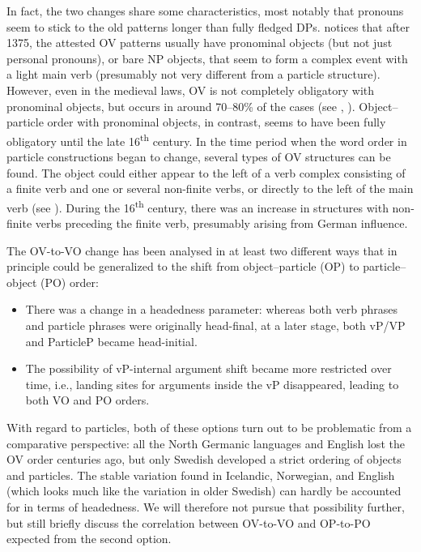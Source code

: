 \documentclass[output=paper]{langscibook}
\begin{document}
In fact, the two changes share some characteristics, most notably that pronouns seem to stick to the old patterns longer than fully fledged DPs. \citet[174]{Delsing1999} notices that after 1375, the attested OV patterns usually have pronominal objects (but not just personal pronouns), or bare NP objects, that seem to form a complex event with a light main verb (presumably not very different from a particle structure). However, even in the medieval laws, OV is not completely obligatory with pronominal objects, but occurs in around 70–80\% of the cases (see \citealt{Delsing1999}, ). Object–particle order with pronominal objects, in contrast, seems to have been fully obligatory until the late 16\textsuperscript{th} century. In the time period when the word order in particle constructions began to change, several types of OV structures can be found. The object could either appear to the left of a verb complex consisting of a finite verb and one or several non-finite verbs, or directly to the left of the main verb (see \citealt{Petzell2011, Petzell2012}). During the 16\textsuperscript{th} century, there was an increase in structures with non-finite verbs preceding the finite verb, presumably arising from German influence.



The OV-to-VO change has been analysed in at least two different ways that in principle could be generalized to the shift from object–particle (OP) to particle–object (PO) order: 


\begin{itemize}
\item There was a change in a headedness parameter: whereas both verb phrases and particle phrases were originally head-final, at a later stage, both vP/VP and ParticleP became head-initial.
\item The possibility of vP-internal argument shift became more restricted over time, i.e., landing sites for arguments inside the vP disappeared, leading to both VO and PO orders.
\end{itemize}

With regard to particles, both of these options turn out to be problematic from a comparative perspective: all the North Germanic languages and English lost the OV order centuries ago, but only Swedish developed a strict ordering of objects and particles. The stable variation found in Icelandic, Norwegian, and English (which looks much like the variation in older Swedish) can hardly be accounted for in terms of headedness. We will therefore not pursue that possibility further, but still briefly discuss the correlation between OV-to-VO and OP-to-PO expected from the second option.
\end{document}
